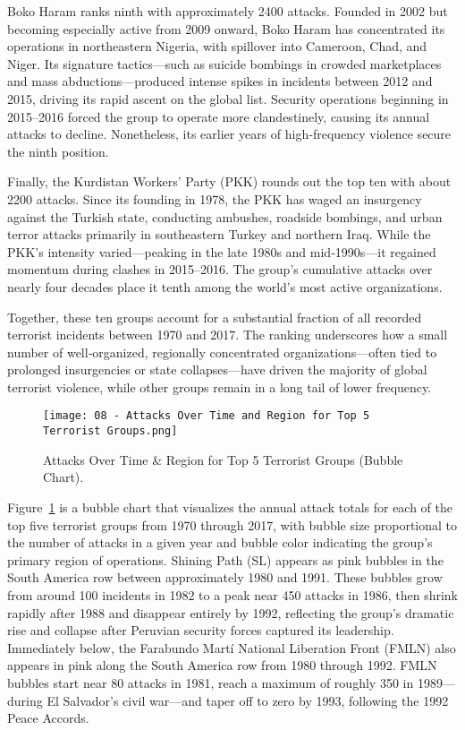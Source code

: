 Boko Haram ranks ninth with approximately 2400 attacks. Founded in 2002 but becoming especially active from 2009 onward, Boko Haram has concentrated its operations in northeastern Nigeria, with spillover into Cameroon, Chad, and Niger. Its signature tactics—such as suicide bombings in crowded marketplaces and mass abductions—produced intense spikes in incidents between 2012 and 2015, driving its rapid ascent on the global list. Security operations beginning in 2015–2016 forced the group to operate more clandestinely, causing its annual attacks to decline. Nonetheless, its earlier years of high‐frequency violence secure the ninth position.  

Finally, the Kurdistan Workers’ Party (PKK) rounds out the top ten with about 2200 attacks. Since its founding in 1978, the PKK has waged an insurgency against the Turkish state, conducting ambushes, roadside bombings, and urban terror attacks primarily in southeastern Turkey and northern Iraq. While the PKK’s intensity varied—peaking in the late 1980s and mid‐1990s—it regained momentum during clashes in 2015–2016. The group’s cumulative attacks over nearly four decades place it tenth among the world’s most active organizations.

Together, these ten groups account for a substantial fraction of all recorded terrorist incidents between 1970 and 2017. The ranking underscores how a small number of well‐organized, regionally concentrated organizations—often tied to prolonged insurgencies or state collapses—have driven the majority of global terrorist violence, while other groups remain in a long tail of lower frequency.  
\vspace{0.5em}
\begin{figure}[ht]
  \centering
  \texttt{[image: 08 - Attacks Over Time and Region for Top 5 Terrorist Groups.png]}
  \caption{Attacks Over Time \& Region for Top 5 Terrorist Groups (Bubble Chart).}
  \label{fig:bubble_top5}
\end{figure}

Figure~\ref{fig:bubble_top5} is a bubble chart that visualizes the annual attack totals for each of the top five terrorist groups from 1970 through 2017, with bubble size proportional to the number of attacks in a given year and bubble color indicating the group’s primary region of operations. Shining Path (SL) appears as pink bubbles in the South America row between approximately 1980 and 1991. These bubbles grow from around 100 incidents in 1982 to a peak near 450 attacks in 1986, then shrink rapidly after 1988 and disappear entirely by 1992, reflecting the group’s dramatic rise and collapse after Peruvian security forces captured its leadership. Immediately below, the Farabundo Martí National Liberation Front (FMLN) also appears in pink along the South America row from 1980 through 1992. FMLN bubbles start near 80 attacks in 1981, reach a maximum of roughly 350 in 1989—during El Salvador’s civil war—and taper off to zero by 1993, following the 1992 Peace Accords.

